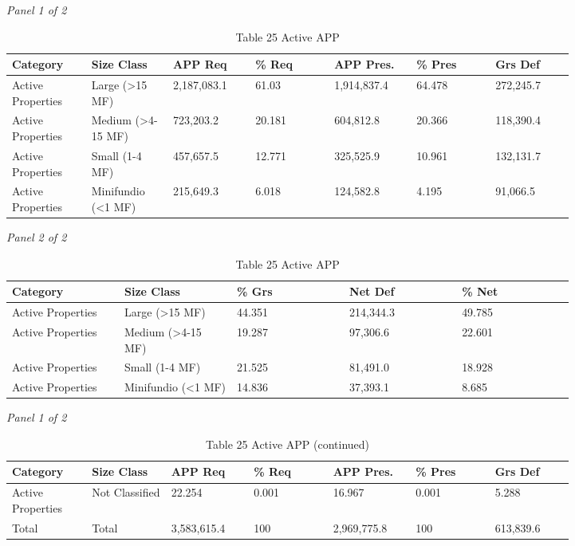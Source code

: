 \documentclass[12pt]{article}
\begin{document}
\begin{landscape}
\begin{table}[H]
\centering
\caption{Table 25 Active APP}
\textit{Panel 1 of 2}\\[2pt]
{\fontsize{12}{14}\selectfont
\setlength{\tabcolsep}{3pt}
\renewcommand{\arraystretch}{1.08}
\begin{tabular}{p{0.117\linewidth}p{0.117\linewidth}p{0.117\linewidth}p{0.117\linewidth}p{0.117\linewidth}p{0.117\linewidth}p{0.117\linewidth}}
\toprule
Category & Size Class & APP Req & \% Req & APP Pres. & \% Pres & Grs Def \\
\midrule
Active Properties & Large (>15 MF) & 2,187,083.1 & 61.03 & 1,914,837.4 & 64.478 & 272,245.7 \\
Active Properties & Medium (>4-15 MF) & 723,203.2 & 20.181 & 604,812.8 & 20.366 & 118,390.4 \\
Active Properties & Small (1-4 MF) & 457,657.5 & 12.771 & 325,525.9 & 10.961 & 132,131.7 \\
Active Properties & Minifundio (<1 MF) & 215,649.3 & 6.018 & 124,582.8 & 4.195 & 91,066.5 \\
\bottomrule
\end{tabular}
}

\vspace{0.6em}

\textit{Panel 2 of 2}\\[2pt]
{\fontsize{12}{14}\selectfont
\setlength{\tabcolsep}{3pt}
\renewcommand{\arraystretch}{1.08}
\begin{tabular}{p{0.164\linewidth}p{0.164\linewidth}p{0.164\linewidth}p{0.164\linewidth}p{0.164\linewidth}}
\toprule
Category & Size Class & \% Grs & Net Def & \% Net \\
\midrule
Active Properties & Large (>15 MF) & 44.351 & 214,344.3 & 49.785 \\
Active Properties & Medium (>4-15 MF) & 19.287 & 97,306.6 & 22.601 \\
Active Properties & Small (1-4 MF) & 21.525 & 81,491.0 & 18.928 \\
Active Properties & Minifundio (<1 MF) & 14.836 & 37,393.1 & 8.685 \\
\bottomrule
\end{tabular}
}
\end{table}
\begin{table}[H]
\centering
\caption{Table 25 Active APP (continued)}
\textit{Panel 1 of 2}\\[2pt]
{\fontsize{12}{14}\selectfont
\setlength{\tabcolsep}{3pt}
\renewcommand{\arraystretch}{1.08}
\begin{tabular}{p{0.117\linewidth}p{0.117\linewidth}p{0.117\linewidth}p{0.117\linewidth}p{0.117\linewidth}p{0.117\linewidth}p{0.117\linewidth}}
\toprule
Category & Size Class & APP Req & \% Req & APP Pres. & \% Pres & Grs Def \\
\midrule
Active Properties & Not Classified & 22.254 & 0.001 & 16.967 & 0.001 & 5.288 \\
Total & Total & 3,583,615.4 & 100 & 2,969,775.8 & 100 & 613,839.6 \\
\bottomrule
\end{tabular}
}


\end{table}
\end{landscape}
\end{document}

